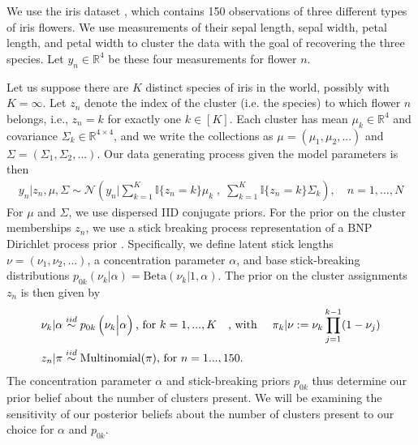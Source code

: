 We use the iris dataset \citep{iris_data_anderson, iris_data_fisher}, which
contains 150 observations of three different types of iris flowers. We use
measurements of their sepal length, sepal width, petal length, and petal width
to cluster the data with the goal of recovering the three species. Let $y_{n}\in
\mathbb{R}^4$ be these four measurements for flower $n$.

Let us suppose there are $K$ distinct species of iris in the world, possibly
with $K=\infty$. Let $z_n$ denote the index of the cluster (i.e. the species) to
which flower $n$ belongs, i.e., $z_n = k$ for exactly one $k\in [K]$. Each
cluster has mean $\mu_k\in \mathbb{R}^4$ and covariance $\Sigma_k \in
\mathbb{R}^{4\times 4}$, and we write the collections as $\mu = \left(\mu_1,
\mu_2, ...\right)$ and $\Sigma = \left(\Sigma_1, \Sigma_2, ... \right)$. Our
data generating process given the model parameters is then
%
\begin{align*}
	y_n | z_n, \mu, \Sigma \sim
        \mathcal{N}\left(
            y_n \Big\vert
                \sum_{k=1}^K \mathbb{I}\{z_n = k\} \mu_k \;,
              \; \sum_{k=1}^K \mathbb{I}\{z_n = k\} \Sigma_k\right),
	\quad n = 1, ..., N
\end{align*}
%
For $\mu$ and $\Sigma$, we use dispersed IID conjugate priors.
%
%
For the prior on the cluster memberships $z_n$, we use a stick breaking
process representation of a BNP Dirichlet process prior
\citep{ferguson:1973:bayesian, sethuraman:1994:constructivedp}. Specifically, we
define latent stick lengths $\nu=\left(\nu_1, \nu_2, ...\right)$, a
concentration parameter $\alpha$, and base stick-breaking distributions
$p_{0k}\left(\nu_k \vert \alpha \right) = \mathrm{Beta}\left(\nu_k \Big\vert 1,
\alpha \right)$.  The prior on the cluster assignments $z_n$ is then given by
%
\begin{align}
\nu_k \vert \alpha &\stackrel{iid}{\sim}
    p_{0k}\left(\nu_k \Big\vert \alpha\right)\textrm{, for }k=1,...,K
    \quad\textrm{, with }\quad \nonumber
\pi_k | \nu := \nu_k \prod_{j=1}^{k-1} (1 - \nu_j) \label{eq:stick_breaking} \\
z_n \vert \pi &\stackrel{iid}{\sim} \mathrm{Multinomial}(\pi)\textrm{, for }n = 1...,150.
\end{align}
%
The concentration parameter $\alpha$ and stick-breaking priors $p_{0k}$
thus determine our prior belief about the number of clusters present.
We will be examining the sensitivity of our posterior beliefs about the
number of clusters present to our choice for $\alpha$ and $p_{0k}$.
